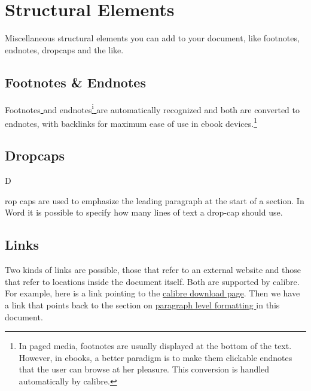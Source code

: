 \documentclass[\officeparserdriver 12pt]{article}
\begin{document}
\clearpage

\section[{Structural Elements}]{\protect\textcolor{hex365F91}{Structural Elements}}\label{structural-elements}

Miscellaneous structural elements you can add to your document, like footnotes, endnotes, dropcaps and the like.

\subsection[{Footnotes \& Endnotes}]{\protect\textcolor{hex4F81BD}{Footnotes \& Endnotes}}\label{footnotes-endnotes}

Footnotes\hyperref[table-of-contents]{\textsuperscript{{\fontsize{8pt}{9.6pt} }}}and endnotes\hyperref[continued-lists]{\textsuperscript{{\fontsize{8pt}{9.6pt}\selectfont i }}}are automatically recognized and both are converted to endnotes, with backlinks for maximum ease of use in ebook devices.\footnote{In paged media, footnotes are usually displayed at the bottom of the text. However, in ebooks, a better paradigm is to make them clickable endnotes that the user can browse at her pleasure. This conversion is handled automatically by calibre.}

\subsection[{Dropcaps}]{\protect\textcolor{hex4F81BD}{Dropcaps}}\label{dropcaps}

{\fontsize{58.5pt}{70.2pt}\selectfont D}

rop caps are used to emphasize the leading paragraph at the start of a section. In Word it is possible to specify how many lines of text a drop-cap should use.

\subsection[{Links}]{\protect\textcolor{hex4F81BD}{Links}}\label{links}

Two kinds of links are possible, those that refer to an external website and those that refer to locations inside the document itself. Both are supported by calibre. For example, here is a link pointing to the \href{http://calibre-ebook.com/download}{calibre download page}. Then we have a link that points back to the section on \hyperref[paragraph-level-formatting]{paragraph level formatting }in this document.
\end{document}
